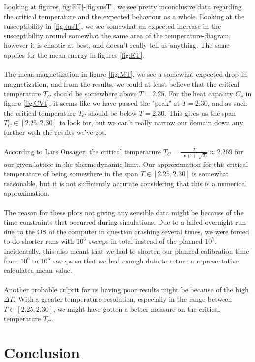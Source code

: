 \documentclass[reprint,english,notitlepage]{revtex4-1}  %
\begin{document}
Looking at figures \ref{fig:ET}-\ref{fig:susT}, we see pretty inconclusive data regarding the critical temperature and the expected behaviour as a whole. Looking at the susceptibility in \ref{fig:susT}, we see somewhat an expected increase in the susceptibility around somewhat the same area of the temperature-diagram, however it is chaotic at best, and doesn't really tell us anything. The same applies for the mean energy in figures \ref{fig:ET}.
\\
\\
The mean magnetization in figure \ref{fig:MT}, we see a somewhat expected drop in magnetization, and from the results, we could at least believe that the critical temperature $T_C$ should be somewhere above $T = 2.25$. For the heat capacity $C_v$ in figure \ref{fig:CVt}, it seems like we have passed the "peak" at $T = 2.30$, and as such the critical temperature $T_C$ should be below $T = 2.30$. This gives us the span $T_C \in [2.25,2.30]$ to look for, but we can't really narrow our domain down any further with the results we've got.
\\
\\
According to Lars Onsager, the critical temperature $T_C = \frac{2}{\ln{(1+\sqrt{2)}}} \approx 2.269$ for our given lattice in the thermodynamic limit. Our approximation for this critical temperature of being somewhere in the span $T \in [2.25,2.30]$ is somewhat reasonable, but it is not sufficiently accurate considering that this is a numerical approximation.
\\
\\
The reason for these plots not giving any sensible data might be because of the time constraints that occurred during simulations. Due to a failed overnight run due to the OS of the computer in question crashing several times, we were forced to do shorter runs with $10^6$ sweeps in total instead of the planned $10^7$. Incidentally, this also meant that we had to shorten our planned calibration time from $10^6$ to $10^5$ sweeps so that we had enough data to return a representative calculated mean value. 
\\
\\
Another probable culprit for us having poor results might be because of the high $\Delta T$. With a greater temperature resolution, especially in the range between $T \in [2.25,2.30]$, we might have gotten a better measure on the critical temperature $T_C$.

\section{Conclusion}
\end{document}
